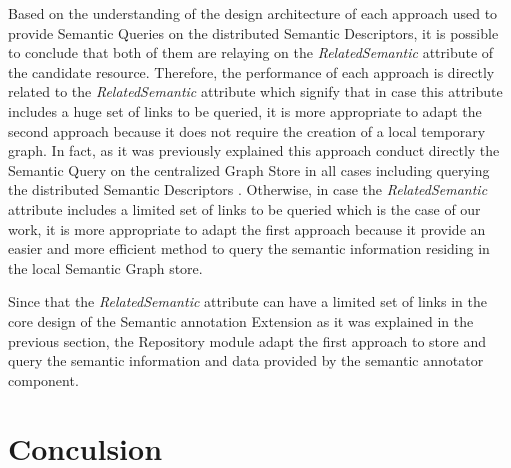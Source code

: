 Based on the understanding of the design architecture of each approach used to provide Semantic Queries on the distributed Semantic Descriptors, it is possible to conclude that both of them are relaying on the \textit{RelatedSemantic} attribute of the candidate resource. Therefore, the performance of each approach is directly related to the \textit{RelatedSemantic} attribute which signify that in case this attribute includes a huge set of links to be queried, it is more appropriate to adapt the second approach because it does not require the creation of a local temporary graph. In fact, as it was previously explained this approach conduct directly the Semantic Query on the centralized Graph Store in all cases including querying the distributed Semantic Descriptors . Otherwise, in case the \textit{RelatedSemantic} attribute includes a limited set of links to be queried which is the case of our work, it is more appropriate to adapt the first approach because it provide an easier and more efficient method to query the semantic information residing in the local Semantic Graph store. \par 

Since that the \textit{RelatedSemantic} attribute can have a limited set of links in the core design of the Semantic annotation Extension as it was explained in the previous section, the Repository module adapt the first approach to store and query the semantic information and data provided by the semantic annotator component.





\section{Conculsion}